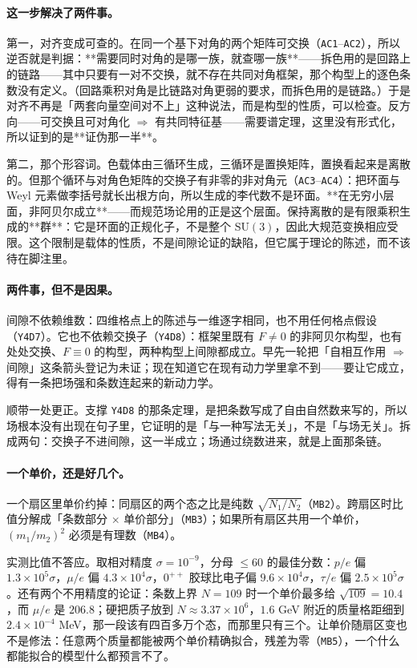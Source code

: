 \documentclass[aps,prd,preprint,superscriptaddress,amsmath,amssymb]{revtex4-2}
\begin{document}
\paragraph{这一步解决了两件事。}
第一，对齐变成可查的。在同一个基下对角的两个矩阵可交换（\texttt{AC1}--\texttt{AC2}），所以逆否就是判据：**需要同时对角的是哪一族，就查哪一族**——拆色用的是回路上的链路——其中只要有一对不交换，就不存在共同对角框架，那个构型上的逐色条数没有定义。（回路乘积对角是比链路对角更弱的要求，而拆色用的是链路。）于是对齐不再是「两套向量空间对不上」这种说法，而是构型的性质，可以检查。反方向——可交换且可对角化 $\Rightarrow$ 有共同特征基——需要谱定理，这里没有形式化，所以证到的是**证伪那一半**。

第二，那个形容词。色载体由三循环生成，三循环是置换矩阵，置换看起来是离散的。但那个循环与对角色矩阵的交换子有非零的非对角元（\texttt{AC3}--\texttt{AC4}）：把环面与 Weyl 元素做李括号就长出根方向，所以生成的李代数不是环面。**在无穷小层面，非阿贝尔成立**——而规范场论用的正是这个层面。保持离散的是有限乘积生成的**群**：它是环面的正规化子，不是整个 $\mathrm{SU}(3)$，因此大规范变换相应受限。这个限制是载体的性质，不是间隙论证的缺陷，但它属于理论的陈述，而不该待在脚注里。

\paragraph{两件事，但不是因果。}
间隙不依赖维数：四维格点上的陈述与一维逐字相同，也不用任何格点假设（\texttt{Y4D7}）。它也不依赖交换子（\texttt{Y4D8}）：框架里既有 $F\ne0$ 的非阿贝尔构型，也有处处交换、$F\equiv0$ 的构型，两种构型上间隙都成立。早先一轮把「自相互作用 $\Rightarrow$ 间隙」这条箭头登记为未证；现在知道它在现有动力学里拿不到——要让它成立，得有一条把场强和条数连起来的新动力学。

顺带一处更正。支撑 \texttt{Y4D8} 的那条定理，是把条数写成了自由自然数来写的，所以场根本没有出现在句子里，它证明的是「与一种写法无关」，不是「与场无关」。拆成两句：交换子不进间隙，这一半成立；场通过绕数进来，就是上面那条链。

\paragraph{一个单价，还是好几个。}
一个扇区里单价约掉：同扇区的两个态之比是纯数 $\sqrt{N_1/N_2}$（\texttt{MB2}）。跨扇区时比值分解成「条数部分 $\times$ 单价部分」（\texttt{MB3}）；如果所有扇区共用一个单价，$(m_1/m_2)^2$ 必须是有理数（\texttt{MB4}）。

实测比值不答应。取相对精度 $\sigma=10^{-9}$，分母 $\le60$ 的最佳分数：$p/e$ 偏 $1.3\times10^{5}\sigma$，$\mu/e$ 偏 $4.3\times10^{4}\sigma$，$0^{++}$ 胶球比电子偏 $9.6\times10^{4}\sigma$，$\tau/e$ 偏 $2.5\times10^{5}\sigma$。还有两个不用精度的论证：条数上界 $N=109$ 时一个单价最多给 $\sqrt{109}=10.4$，而 $\mu/e$ 是 $206.8$；硬把质子放到 $N\approx3.37\times10^{6}$，$1.6$ GeV 附近的质量格距细到 $2.4\times10^{-4}$ MeV，那一段该有四百多万个态，而那里只有三个。让单价随扇区变也不是修法：任意两个质量都能被两个单价精确拟合，残差为零（\texttt{MB5}），一个什么都能拟合的模型什么都预言不了。
\end{document}

